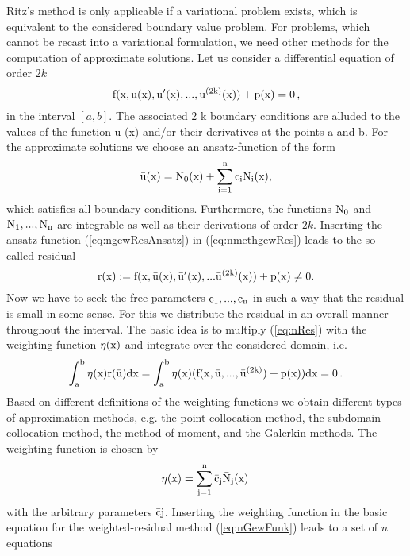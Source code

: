 Ritz's method is only applicable if a variational problem exists, which
is equivalent to the considered boundary value problem. For
problems, which cannot be recast into a variational formulation, we
need other methods for the computation of approximate solutions.
Let us consider a differential equation of order  $ 2 k$
\begin{equation}
\rm
f(x, u(x), u'(x),...,u^{(2k)}(x)) + p(x) = 0 \, ,
\label{eq:nmethgewRes}
\end{equation}
in the interval $[a, b]$. The associated 2 k boundary conditions
are alluded to the values of the function u (x)  and/or their
derivatives at the points a and b. For the approximate
solutions we choose an ansatz-function of the form
\begin{equation}
\rm
\bar{u}(x) = N_0(x) + \sum_{i=1}^n c_i N_i(x),
\label{eq:ngewResAnsatz}
\end{equation}
which satisfies all boundary conditions. Furthermore, the
functions $\rm N_0$ and $\rm N_1,..., N_n$ are integrable as well as
their derivations of order $2k$. Inserting the ansatz-function
(\ref{eq:ngewResAnsatz}) in 
(\ref{eq:nmethgewRes}) leads to the so-called residual
\begin{equation}
\rm
r(x) := f(x, \bar{u}(x), \bar{u}'(x),...\bar{u}^{(2k)}(x))
+ p(x) \neq 0.
\label{eq:nRes}
\end{equation}
Now we have to seek the free parameters $\rm c_1, ..., c_n$ in such a
way that the residual is small in some sense. For this we
distribute the residual in an overall manner throughout the
interval. The basic idea is to multiply (\ref{eq:nRes}) with the weighting function $\rm \eta (x)$ and
integrate over the considered domain, i.e.
\begin{equation}
\rm
\int_a^b \eta(x) r(\bar{u}) dx = \int_a^b \eta(x) 
(f(x, \bar{u},...,\bar{u}^{(2k)}) + p(x)) dx = 0 \, .
\label{eq:nGewFunk}
\end{equation}
Based on different definitions of the weighting functions we
obtain different types of approximation methods, e.g. the
point-collocation method, the subdomain-collocation method, the
method of moment, and the Galerkin methods. The weighting function
is chosen by
\begin{equation}
\rm
\eta(x) = \sum_{j=1}^n \bar{c}_j \bar{N}_j(x) \, 
\label{eq:netaAns}
\end{equation}
with the arbitrary parameters $\rm\bar{c} j$. Inserting the weighting
function in the basic equation for the weighted-residual method
(\ref{eq:nGewFunk}) leads to a set of $ n $ equations
